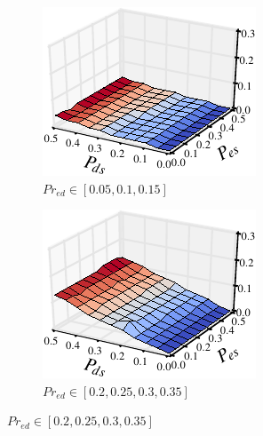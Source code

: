 \begin{figure}[t!]
  \centering
  \begin{subfigure}{0.33\textwidth}
    \centering
    \includegraphics[width=\textwidth]{./figures/scripts/MutationDUTJaccard3DFigure_0_10.pdf}
    \caption{$Pr_{ed} \in [0.05, 0.1, 0.15]$}
  \end{subfigure}\hspace*{0.01\textwidth}
  \begin{subfigure}{0.33\textwidth}
    \centering
    \includegraphics[width=\textwidth]{./figures/scripts/MutationDUTJaccard3DFigure_0_30.pdf}
    \caption{$Pr_{ed} \in [0.2, 0.25, 0.3, 0.35]$}

\end{subfigure}
\end{figure}

